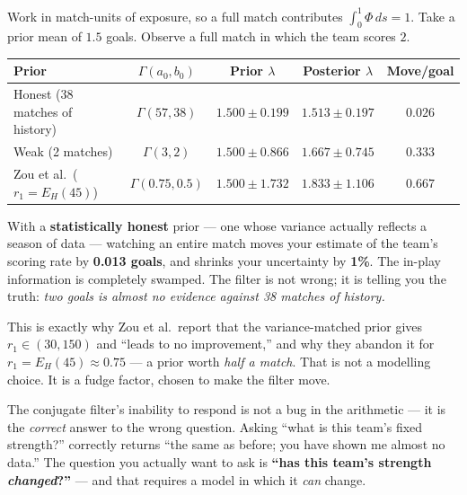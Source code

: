\documentclass[11pt,a4paper]{article}
\theoremstyle{plain}
\begin{document}
\begin{worked}
Work in match-units of exposure, so a full match contributes $\int_0^1\Phi\,ds = 1$. Take a
prior mean of $1.5$ goals. Observe a full match in which the team scores $2$.

\smallskip
\begin{center}
\small
\begin{tabular}{@{}lcccc@{}}
\toprule
\textbf{Prior} & $\Gamma(a_0,b_0)$ & \textbf{Prior} $\lambda$ & \textbf{Posterior} $\lambda$ & \textbf{Move/goal} \\
\midrule
Honest (38 matches of history) & $\Gamma(57,38)$ & $1.500\pm0.199$ & $1.513\pm0.197$ & $\mathbf{0.026}$ \\
Weak (2 matches)               & $\Gamma(3,2)$   & $1.500\pm0.866$ & $1.667\pm0.745$ & $0.333$ \\
Zou et al.\ ($r_1 = E_H(45)$)  & $\Gamma(0.75,0.5)$ & $1.500\pm1.732$ & $1.833\pm1.106$ & $\mathbf{0.667}$ \\
\bottomrule
\end{tabular}
\end{center}

\smallskip
With a \textbf{statistically honest} prior --- one whose variance actually reflects a season of
data --- watching an entire match moves your estimate of the team's scoring rate by
\textbf{0.013 goals}, and shrinks your uncertainty by \textbf{1\%}. The in-play information is
completely swamped. The filter is not wrong; it is telling you the truth: \emph{two goals is
almost no evidence against 38 matches of history.}

\smallskip
This is exactly why Zou et al.\ report that the variance-matched prior gives $r_1\in(30,150)$
and ``leads to no improvement,'' and why they abandon it for $r_1 = E_H(45)\approx0.75$ --- a
prior worth \emph{half a match}. That is not a modelling choice. It is a fudge factor, chosen
to make the filter move.
\end{worked}

\begin{point}
The conjugate filter's inability to respond is not a bug in the arithmetic --- it is the
\emph{correct} answer to the wrong question. Asking ``what is this team's fixed strength?''
correctly returns ``the same as before; you have shown me almost no data.'' The question you
actually want to ask is \textbf{``has this team's strength \emph{changed}?''} --- and that
requires a model in which it \emph{can} change.
\end{point}
\end{document}

